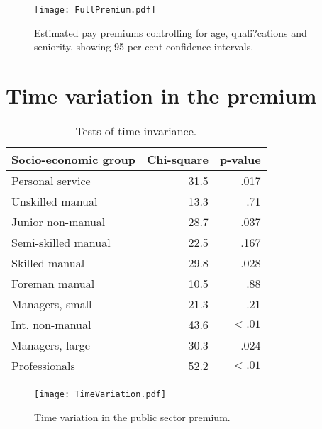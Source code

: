 \documentclass[a4paper,11pt,titlepage]{article}
\begin{document}
\begin{figure}
    \texttt{[image: FullPremium.pdf]}
    \caption{Estimated pay premiums controlling for age, quali?cations and seniority,
    showing 95 per cent confidence intervals.\label{fig:full}}
\end{figure}


\section{Time variation in the premium}

\begin{comment}
Not sure whether to include a discussion of this or not.
\end{comment}

\begin{table}[ht]
    \caption{Tests of time invariance. \label{tab:time}}
    \begin{center}
    \begin{tabular}{lrr}
    \toprule
    Socio-economic group & Chi-square & p-value \\
    \midrule
    Personal service & 31.5 & .017 \\
    Unskilled manual & 13.3 & .71 \\
    Junior non-manual & 28.7 & .037 \\
    Semi-skilled manual & 22.5 & .167 \\
    Skilled manual & 29.8 & .028 \\
    Foreman manual & 10.5 & .88 \\
    Managers, small & 21.3 & .21 \\
    Int. non-manual & 43.6 & $ < .01 $\\
    Managers, large&30.3 & .024 \\
    Professionals & 52.2 & $< .01$ \\
    \bottomrule
    \end{tabular}
    \end{center}
\end{table}

\begin{figure}[ht]
    \texttt{[image: TimeVariation.pdf]}
    \caption{Time variation in the public sector premium. \label{fig:time}}
\end{figure}

\clearpage

\end{document}
